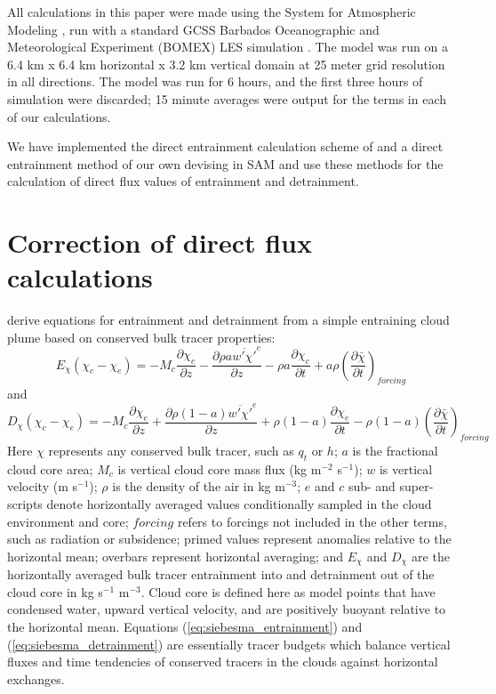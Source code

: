 \documentclass[draft,grl]{agutex}
\begin{document}
\begin{article}
All calculations in this paper were made using the System for Atmospheric 
Modeling \citep[SAM;][]{Khairoutdinov2003}, run with a standard GCSS Barbados 
Oceanographic and Meteorological Experiment (BOMEX) LES simulation 
\citep{Holland1973, Siebesma2003}.  The model was run on a 6.4 km x 6.4 km 
horizontal x 3.2 km vertical domain at 25 meter grid resolution in all 
directions.  The model was run for 6 hours, and the first three hours 
of simulation were discarded; 15 minute averages were output for the terms 
in each of our calculations.  

We have implemented the direct entrainment calculation scheme of 
\cite{Romps2010} and a direct entrainment method of our own devising 
\citep{Dawe2011} in SAM and use these methods for the calculation of direct flux 
values of entrainment and detrainment.

\section{Correction of direct flux calculations}

\cite{Siebesma1995} derive equations for entrainment and detrainment from a 
simple entraining cloud plume based on conserved bulk tracer properties:
\begin{equation}
  \label{eq:siebesma_entrainment}
    E_{\chi}(\chi_c - \chi_e) = - M_c \frac{\partial \chi_c}{\partial z}
        - \frac{\partial \rho a \overline{w' \chi'}^c}{\partial z}
        - \rho a \frac{\partial \chi_c}{\partial t}
        + a \rho \left(\frac{\partial \bar{\chi}}{\partial t}\right)_{forcing}
\end{equation}
and
\begin{equation}
  \label{eq:siebesma_detrainment}
    D_{\chi}(\chi_c - \chi_e) = - M_c \frac{\partial \chi_e}{\partial z}
        + \frac{\partial \rho (1 - a) \overline{w' \chi'}^e}{\partial z}
        + \rho (1-a) \frac{\partial \chi_e}{\partial t}
     - \rho (1-a) \left(\frac{\partial \bar{\chi}}{\partial t}\right)_{forcing}
\end{equation}
Here $\chi$ represents any conserved bulk tracer, such as $q_t$ or $h$; $a$ is 
the fractional cloud core area; $M_c$ is vertical cloud core mass flux 
(kg m$^{-2}$ s$^{-1}$); $w$ is vertical velocity (m s$^{-1}$); $\rho$ is the 
density of the air in kg m$^{-3}$; $e$ and $c$ sub- and super-scripts denote 
horizontally averaged values conditionally sampled in the cloud environment and 
core; $forcing$ refers to forcings not included in the other terms, such as 
radiation or subsidence; primed values represent anomalies relative to the 
horizontal mean; overbars represent horizontal averaging; and $E_{\chi}$ and 
$D_{\chi}$ are the horizontally averaged bulk tracer entrainment into and 
detrainment out of the cloud core in kg s$^{-1}$ m$^{-3}$.  Cloud core is 
defined here as model points that have condensed water, upward vertical 
velocity, and are positively buoyant relative to the horizontal mean.  
Equations (\ref{eq:siebesma_entrainment}) and (\ref{eq:siebesma_detrainment}) 
are essentially tracer budgets which balance vertical fluxes and time 
tendencies of conserved tracers in the clouds against horizontal exchanges.


\end{article}
\end{document}
